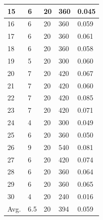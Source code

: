 \documentclass[runningheads]{llncs}
\begin{document}
\begin{table}[]
\begin{tabular}{|l|l|l|l|l|}
        15 & 6 & 20 & 360 & 0.045 \\ \hline
        16 & 6 & 20 & 360 & 0.059 \\ \hline
        17 & 6 & 20 & 360 & 0.061 \\ \hline
        18 & 6 & 20 & 360 & 0.058 \\ \hline
        19 & 5 & 20 & 300 & 0.060 \\ \hline
        20 & 7 & 20 & 420 & 0.067 \\ \hline
        21 & 7 & 20 & 420 & 0.060 \\ \hline
        22 & 7 & 20 & 420 & 0.085 \\ \hline
        23 & 7 & 20 & 420 & 0.071 \\ \hline
        24 & 4 & 20 & 300 & 0.049 \\ \hline
        25 & 6 & 20 & 360 & 0.050 \\ \hline
        26 & 9 & 20 & 540 & 0.081 \\ \hline
        27 & 6 & 20 & 420 & 0.074 \\ \hline
        28 & 6 & 20 & 360 & 0.064 \\ \hline
        29 & 6 & 20 & 360 & 0.065 \\ \hline
        30 & 4 & 20 & 240 & 0.016 \\ \hline
        Avg. & 6.5 & 20 & 394 & 0.059 \\ \hline
        \end{tabular}
        \end{table}
\end{document}
